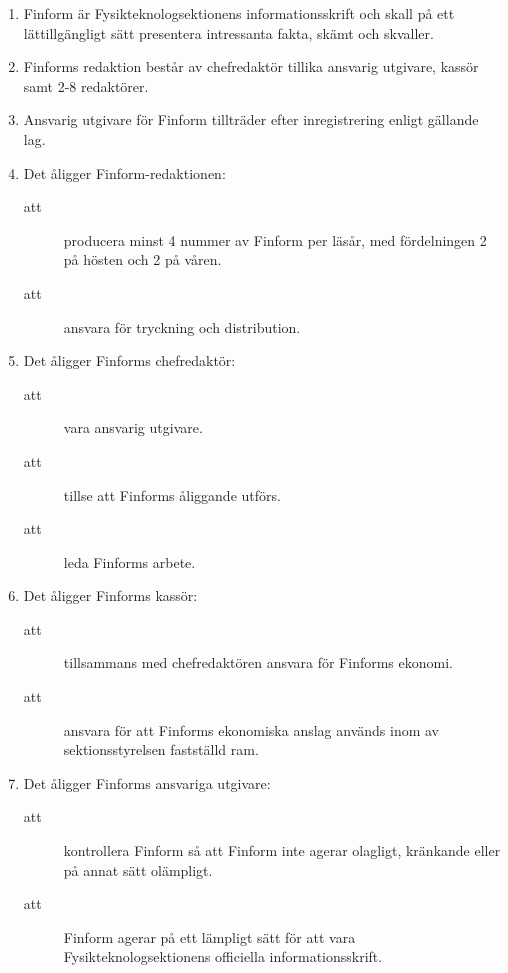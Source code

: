 \documentclass[11pt,a4paper]{article}
\begin{document}
\begin{enumerate}[\thesubsection .1]

  \item Finform är Fysikteknologsektionens informationsskrift och
  skall på ett lättillgängligt sätt presentera intressanta fakta,
  skämt och skvall\-er. 

  \item Finforms redaktion består av chefredaktör tillika ansvarig utgivare, kassör samt 2-8
  redak\-tör\-er.

  \item Ansvarig utgivare för Finform tillträder efter
  inregistrering enligt gällande lag.

  \item Det åligger Finform-redaktionen:
    \begin{description}
      \item[att] producera minst 4 nummer av Finform per läsår, med för\-del\-ningen 2 på hösten och 2 på våren.
      \item[att] ansvara för tryckning och distribution.

    \end{description}

  \item Det åligger Finforms chefredaktör:
    \begin{description}
       \item[att] vara ansvarig utgivare.
      \item[att] tillse att Finforms åliggande  utförs.
      \item[att] leda Finforms arbete.
    \end{description}


  \item Det åligger Finforms kassör:
    \begin{description}
      \item[att] tillsammans med chefredaktören ansvara för Finforms ekonomi.
      \item[att] ansvara för att Finforms ekonomiska anslag används inom av sektionsstyrelsen fastställd ram.
    \end{description}


  \item Det åligger Finforms ansvariga utgivare:
    \begin{description}
      \item[att] kontrollera Finform så att Finform inte agerar olagligt, krän\-kan\-de eller på annat sätt olämpligt.
      \item[att] Finform agerar på ett lämpligt sätt för att vara Fysikteknolog\-sek\-tionens officiella informationsskrift.
    \end{description}

\end{enumerate}
\end{document}
